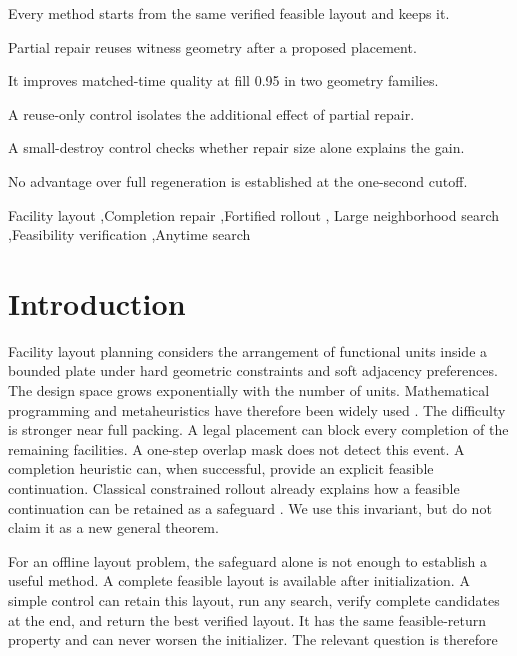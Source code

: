 \documentclass[preprint,12pt,authoryear]{elsarticle}
\begin{document}
\begin{frontmatter}
\begin{highlights}
\item Every method starts from the same verified feasible layout and keeps it.
\item Partial repair reuses witness geometry after a proposed placement.
\item It improves matched-time quality at fill 0.95 in two geometry families.
\item A reuse-only control isolates the additional effect of partial repair.
\item A small-destroy control checks whether repair size alone explains the gain.
\item No advantage over full regeneration is established at the one-second cutoff.
\end{highlights}

\begin{keyword}
Facility layout \sep Completion repair \sep Fortified rollout \sep
Large neighborhood search \sep Feasibility verification \sep Anytime search
\end{keyword}

\end{frontmatter}

\section{Introduction}
\label{sec:intro}

Facility layout planning considers the arrangement of functional units inside a
bounded plate under hard geometric constraints and soft adjacency preferences.
The design space grows exponentially with the number of units. Mathematical
programming and metaheuristics have therefore been widely used
\citep{perez2021facility,gomes2000metaheuristic,csahin2020mathematical,Drira2007,singh2006review}.
The difficulty is stronger near full packing. A legal placement can block every
completion of the remaining facilities. A one-step overlap mask does not detect
this event. A completion heuristic can, when successful, provide an explicit
feasible continuation. Classical constrained rollout already explains how a
feasible continuation can be retained as a safeguard
\citep{Bertsekas2005Constrained,Bertsekas2020Constrained}. We use this invariant,
but do not claim it as a new general theorem.

For an offline layout problem, the safeguard alone is not enough to establish a
useful method. A complete feasible layout is available after initialization. A
simple control can retain this layout, run any search, verify complete candidates
at the end, and return the best verified layout. It has the same feasible-return
property and can never worsen the initializer. The relevant question is therefore
\end{document}

